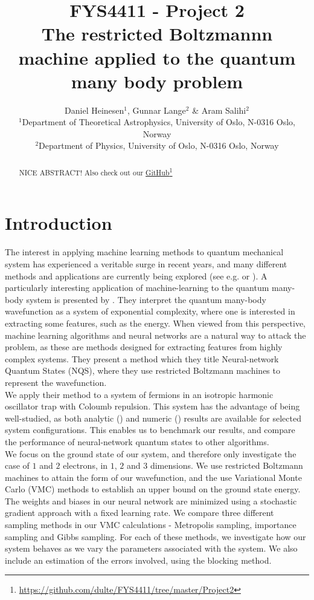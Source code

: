 \documentclass[a4paper, 10pt]{article}
\title{FYS4411 - Project 2\\
	The restricted Boltzmannn machine applied to the quantum many body problem}
\author{Daniel Heinesen$^1$, Gunnar Lange$^2$ \& Aram Salihi$^2$\\
	\small $^1$Department of Theoretical Astrophysics, University of Oslo, N-0316 Oslo, Norway\\
	\small $^2$Department of Physics, University of Oslo, N-0316 Oslo, Norway}
\begin{document}
	\maketitle
	\begin{abstract}
	\begin{center}
	 NICE ABSTRACT! Also check out our \href{https://github.com/dulte/FYS4411/tree/master/Project2}{GitHub}\footnote{\url{https://github.com/dulte/FYS4411/tree/master/Project2}}
\end{center}
	\end{abstract}
	\newpage
	\tableofcontents
	\newpage
	\section{Introduction}
	The interest in applying machine learning methods to quantum mechanical system has experienced a veritable surge in recent years, and many different methods and applications are currently being explored (see e.g. \cite{Broecker2017} or \cite{Botu2015}). A particularly interesting application of machine-learning to the quantum many-body system is presented by \cite{Carleo602}. They interpret the quantum many-body wavefunction as a system of exponential complexity, where one is interested in extracting some features, such as the energy. When viewed from this perspective, machine learning algorithms and neural networks are a natural way to attack the problem, as these are methods designed for extracting features from highly complex systems. They present a method which they title Neural-network Quantum States (NQS), where they use restricted Boltzmann machines to represent the wavefunction.\\
	\linebreak
	We apply their method to a system of fermions in an isotropic harmonic oscillator trap with Coloumb repulsion. This system has the advantage of being well-studied, as both analytic (\cite{0305-4470-27-3-040}) and numeric (\cite{PhysRevB.84.115302}) results are available for selected system configurations. This enables us to benchmark our results, and compare the performance of neural-network quantum states to other algorithms.\\
	\linebreak
	We focus on the ground state of our system, and therefore only investigate the case of $1$ and $2$ electrons, in $1$, $2$ and $3$ dimensions. We use restricted Boltzmann machines to attain the form of our wavefunction, and the use Variational Monte Carlo (VMC) methods to establish an upper bound on the ground state energy. The weights and biases in our neural network are minimized using a stochastic gradient approach with a fixed learning rate. We compare three different sampling methods in our VMC calculations - Metropolis sampling, importance sampling and Gibbs sampling. For each of these methods, we investigate how our system behaves as we vary the parameters associated with the system. We also include an estimation of the errors involved, using the blocking method.
\end{document}
